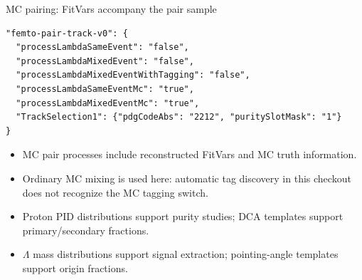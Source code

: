 \begin{frame}[fragile]{MC pairing: FitVars accompany the pair sample}
 \begin{lstlisting}
"femto-pair-track-v0": {
  "processLambdaSameEvent": "false",
  "processLambdaMixedEvent": "false",
  "processLambdaMixedEventWithTagging": "false",
  "processLambdaSameEventMc": "true",
  "processLambdaMixedEventMc": "true",
  "TrackSelection1": {"pdgCodeAbs": "2212", "puritySlotMask": "1"}
}
 \end{lstlisting}
 \begin{itemize}
 \item MC pair processes include reconstructed FitVars and MC truth information.
 \item Ordinary MC mixing is used here: automatic tag discovery in this checkout does not recognize the MC tagging switch.
 \item Proton PID distributions support purity studies; DCA templates support primary/secondary fractions.
 \item $\Lambda$ mass distributions support signal extraction; pointing-angle templates support origin fractions.
 \end{itemize}
\end{frame}

